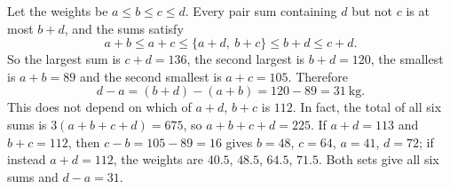 Let the weights be $a\le b\le c\le d$. Every pair sum containing $d$ but not $c$ is at most $b+d$, and the sums satisfy
\[
a+b\le a+c\le \{a+d,\ b+c\}\le b+d\le c+d .
\]
So the largest sum is $c+d=136$, the second largest is $b+d=120$, the smallest is $a+b=89$ and the second smallest is $a+c=105$. Therefore
\[
d-a=(b+d)-(a+b)=120-89=\boxed{31}\ \text{kg}.
\]
This does not depend on which of $a+d$, $b+c$ is $112$. In fact, the total of all six sums is $3(a+b+c+d)=675$, so $a+b+c+d=225$. If $a+d=113$ and $b+c=112$, then $c-b=105-89=16$ gives $b=48$, $c=64$, $a=41$, $d=72$; if instead $a+d=112$, the weights are $40.5$, $48.5$, $64.5$, $71.5$. Both sets give all six sums and $d-a=31$.

